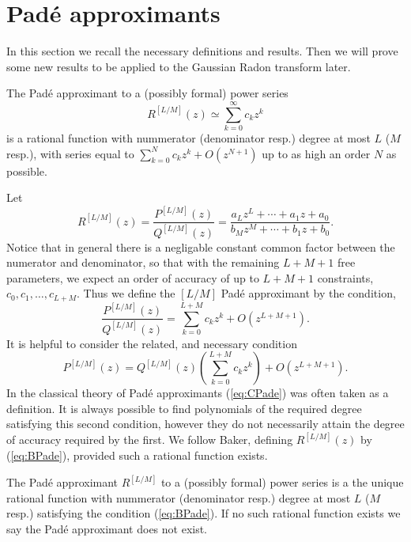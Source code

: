 \section{Pad\'e approximants}

In this section we recall the necessary definitions and results. Then we will prove some new results to be applied to the Gaussian Radon transform later.

\begin{definition}
  The Pad\'e approximant to a (possibly formal) power series 
  \[
    R^{[L/M]}(z) \simeq \sum_{k=0}^\infty c_k z^k
  \]
  is a rational function with nummerator (denominator resp.) degree at most $L$ ($M$ resp.), with series equal to $\sum_{k=0}^N c_k z^k + O(z^{N+1})$ up to as high an order $N$ as possible. 
\end{definition}

Let
\[
  R^{[L/M]}(z) = \frac{P^{[L/M]}(z)}{Q^{[L/M]}(z)} = \frac{a_L z^L + \cdots + a_1z + a_0}{b_M z^M + \cdots + b_1z + b_0}.
\]
Notice that in general there is a negligable constant common factor between the numerator and denominator, so that with the remaining $L+M+1$ free parameters, we expect an order of accuracy of up to $L+M+1$ constraints, $c_0, c_1, \ldots, c_{L+M}$. Thus we define the $[L/M]$ Pad\'e approximant by the condition,
\begin{equation}
  \label{eq:BPade}
  \frac{P^{[L/M]}(z)}{Q^{[L/M]}(z)} = \sum_{k=0}^{L+M} c_k z^k + O\left(z^{L+M+1}\right).
\end{equation}
It is helpful to consider the related, and necessary condition
\begin{equation}
  \label{eq:CPade}
  P^{[L/M]}(z) = Q^{[L/M]}(z)\left(\sum_{k=0}^{L+M} c_k z^k\right) + O\left(z^{L+M+1}\right).
\end{equation}
In the classical theory of Pad\'e approximants (\ref{eq:CPade}) was often taken as a definition. It is always possible to find polynomials of the required degree satisfying this second condition, however they do not necessarily attain the degree of accuracy required by the first. We follow Baker, defining $R^{[L/M]}(z)$ by (\ref{eq:BPade}), provided such a rational function exists.

\begin{definition}
  The Pad\'e approximant $R^{[L/M]}$ to a (possibly formal) power series is a the unique rational function with nummerator (denominator resp.) degree at most $L$ ($M$ resp.) satisfying the condition (\ref{eq:BPade}). If no such rational function exists we say the Pad\'e approximant does not exist.
\end{definition}

